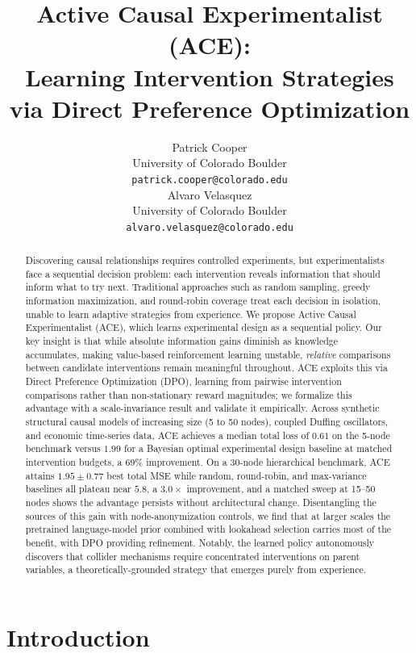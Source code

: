 \documentclass{article}
\title{Active Causal Experimentalist (ACE):\\Learning Intervention Strategies via Direct Preference Optimization}
\author{%
  Patrick Cooper\\
  University of Colorado Boulder\\
  \texttt{patrick.cooper@colorado.edu}\\
  \And
  Alvaro Velasquez\\
  University of Colorado Boulder\\
  \texttt{alvaro.velasquez@colorado.edu}\\
}
\theoremstyle{plain}
\theoremstyle{definition}
\theoremstyle{remark}
\begin{document}
\maketitle

\begin{abstract}
Discovering causal relationships requires controlled experiments, but experimentalists face a sequential decision problem: each intervention reveals information that should inform what to try next. Traditional approaches such as random sampling, greedy information maximization, and round-robin coverage treat each decision in isolation, unable to learn adaptive strategies from experience. We propose Active Causal Experimentalist (ACE), which learns experimental design as a sequential policy. Our key insight is that while absolute information gains diminish as knowledge accumulates, making value-based reinforcement learning unstable, \emph{relative} comparisons between candidate interventions remain meaningful throughout. ACE exploits this via Direct Preference Optimization (DPO), learning from pairwise intervention comparisons rather than non-stationary reward magnitudes; we formalize this advantage with a scale-invariance result and validate it empirically. Across synthetic structural causal models of increasing size (5 to 50 nodes), coupled Duffing oscillators, and economic time-series data, ACE achieves a median total loss of $0.61$ on the 5-node benchmark versus $1.99$ for a Bayesian optimal experimental design baseline at matched intervention budgets, a $69\%$ improvement. On a 30-node hierarchical benchmark, ACE attains $1.95\pm0.77$ best total MSE while random, round-robin, and max-variance baselines all plateau near $5.8$, a $3.0\times$ improvement, and a matched sweep at 15--50 nodes shows the advantage persists without architectural change. Disentangling the sources of this gain with node-anonymization controls, we find that at larger scales the pretrained language-model prior combined with lookahead selection carries most of the benefit, with DPO providing refinement. Notably, the learned policy autonomously discovers that collider mechanisms require concentrated interventions on parent variables, a theoretically-grounded strategy that emerges purely from experience.
\end{abstract}

\section{Introduction}
\end{document}
